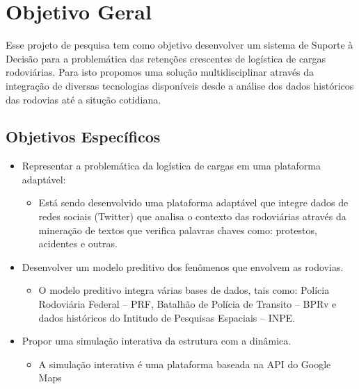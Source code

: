 \section{Objetivo Geral}\label{intro:objetivo}

Esse projeto de pesquisa tem como objetivo desenvolver um sistema de Suporte à Decisão para a problemática das retenções crescentes 
de logística de cargas rodoviárias. Para isto propomos uma solução multidisciplinar através da integração de diversas tecnologias disponíveis desde a análise dos 
dados históricos das rodovias até a situção cotidiana.

\subsection{Objetivos Específicos}\label{intro:especificos}

\begin{itemize}
 \item Representar a problemática da logística de cargas em uma plataforma adaptável:
      \begin{itemize}
       \item Está sendo desenvolvido uma plataforma adaptável que integre dados de redes sociais (Twitter) que analisa o contexto das rodoviárias através da mineração
       de textos que verifica palavras chaves como: protestos, acidentes e outras.
      \end{itemize}

 \item Desenvolver um modelo preditivo dos fenômenos que envolvem as rodovias.
      \begin{itemize}
       \item O modelo preditivo integra várias bases de dados, tais como: Polícia Rodoviária Federal -- PRF, Batalhão de Polícia de Transito -- BPRv e dados históricos 
       do Intitudo de Pesquisas Espaciais -- INPE.
      \end{itemize}

 \item Propor uma simulação interativa da estrutura com a dinâmica.
      \begin{itemize}
       \item A simulação interativa é uma plataforma baseada na API do Google Maps
      \end{itemize}

\end{itemize}



